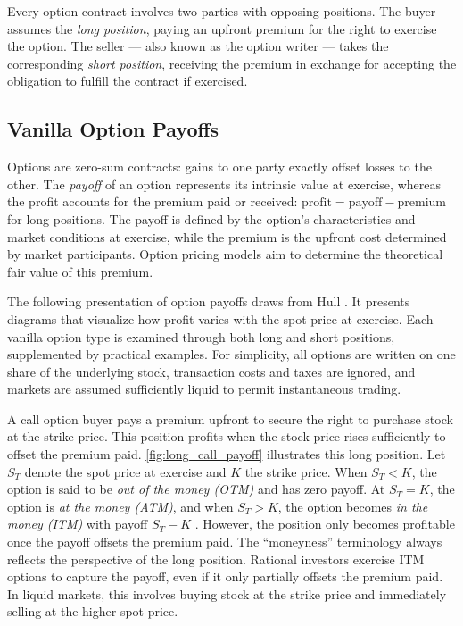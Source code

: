 \documentclass[english,12pt,a4paper,pdftex,sci,utf8]{aaltothesis}
\begin{document}
Every option contract involves two parties with opposing positions. The buyer assumes the \emph{long position}, paying an upfront premium for the right to exercise the option. The seller --- also known as the option writer --- takes the corresponding \emph{short position}, receiving the premium in exchange for accepting the obligation to fulfill the contract if exercised.

\subsection{Vanilla Option Payoffs}\label{subsec:payoffs}

Options are zero-sum contracts: gains to one party exactly offset losses to the other. The \emph{payoff} of an option represents its intrinsic value at exercise, whereas the profit accounts for the premium paid or received: \mbox{$\text{profit} = \text{payoff} - \text{premium}$} for long positions. The payoff is defined by the option's characteristics and market conditions at exercise, while the premium is the upfront cost determined by market participants. Option pricing models aim to determine the theoretical fair value of this premium.

The following presentation of option payoffs draws from Hull \cite{hull2018}. It presents diagrams that visualize how profit varies with the spot price at exercise. Each vanilla option type is examined through both long and short positions, supplemented by practical examples. For simplicity, all options are written on one share of the underlying stock, transaction costs and taxes are ignored, and markets are assumed sufficiently liquid to permit instantaneous trading.

A call option buyer pays a premium upfront to secure the right to purchase stock at the strike price. This position profits when the stock price rises sufficiently to offset the premium paid. \cref{fig:long_call_payoff} illustrates this long position. Let $S_T$ denote the spot price at exercise and $K$ the strike price. When $S_T < K$, the option is said to be \emph{out of the money (OTM)} and has zero payoff. At $S_T = K$, the option is \emph{at the money (ATM)}, and when $S_T > K$, the option becomes \emph{in the money (ITM)} with payoff $S_T - K$ \cite{hull2018}. However, the position only becomes profitable once the payoff offsets the premium paid. The ``moneyness'' terminology always reflects the perspective of the long position. Rational investors exercise ITM options to capture the payoff, even if it only partially offsets the premium paid. In liquid markets, this involves buying stock at the strike price and immediately selling at the higher spot price.
\end{document}
